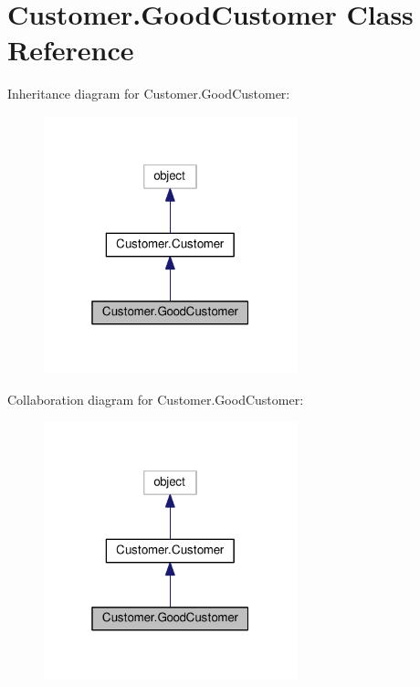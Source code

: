 \hypertarget{class_customer_1_1_good_customer}{}\section{Customer.\+Good\+Customer Class Reference}
\label{class_customer_1_1_good_customer}


Inheritance diagram for Customer.\+Good\+Customer\+:\nopagebreak
\begin{figure}[H]
\begin{center}
\leavevmode
\includegraphics[width=208pt]{class_customer_1_1_good_customer__inherit__graph}
\end{center}
\end{figure}


Collaboration diagram for Customer.\+Good\+Customer\+:\nopagebreak
\begin{figure}[H]
\begin{center}
\leavevmode
\includegraphics[width=208pt]{class_customer_1_1_good_customer__coll__graph}
\end{center}
\end{figure}

